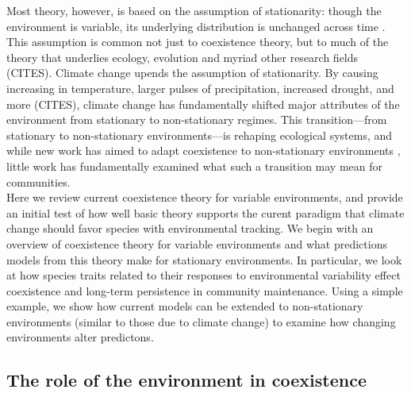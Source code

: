 \documentclass[11pt,letterpaper]{article}
\begin{document}
 Most theory, however, is based on the assumption of stationarity: though the environment is variable, its underlying distribution is unchanged across time \citep{barabas2018}. This assumption is common not just to coexistence theory, but to much of the theory that underlies ecology, evolution and myriad other research fields (CITES). Climate change upends the assumption of stationarity. By causing increasing in temperature, larger pulses of precipitation, increased drought, and more (CITES), climate change has fundamentally shifted major attributes of the environment from stationary to non-stationary regimes. This transition---from stationary to non-stationary environments---is rehaping ecological systems, and while new work has aimed to adapt coexistence to non-stationary environments \citep{chessonnonstat}, little work has fundamentally examined what such a transition may mean for communities. \\

Here we review current coexistence theory for variable environments, and provide an initial test of how well basic theory supports the curent paradigm that climate change should favor species with environmental tracking. We begin with an overview of coexistence theory for variable environments and what predictions models from this theory make for stationary environments. In particular, we look at how species traits related to their responses to environmental variability effect coexistence and long-term persistence in community maintenance. Using a simple example, we show how current models can be extended to non-stationary environments (similar to those due to climate change) to examine how changing environments alter predictons.


\subsection{The role of the environment in coexistence}
\end{document}
